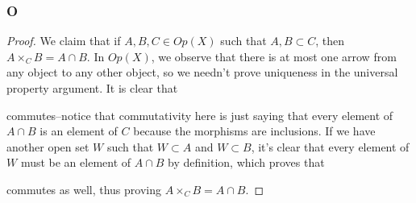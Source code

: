 \documentclass{article}
\begin{document}
\subsubsection{O}\label{1.3.O}
\begin{proof}
    We claim that if $A,B,C\in Op(X)$ such that $A,B\subset C$, then $A\times_C B=A\cap B$. In $Op(X)$, we observe that there is at most one arrow from any object to any other object, so we needn't prove uniqueness in the universal property argument. It is clear that
    \begin{center}
    \end{center}
    commutes--notice that commutativity here is just saying that every element of $A\cap B$ is an element of $C$ because the morphisms are inclusions. If we have another open set $W$ such that $W\subset A$ and $W\subset B$, it's clear that every element of $W$ must be an element of $A\cap B$ by definition, which proves that
    \begin{center}
    \end{center}
    commutes as well, thus proving $A\times_C B=A\cap B$.
\end{proof}
\end{document}
